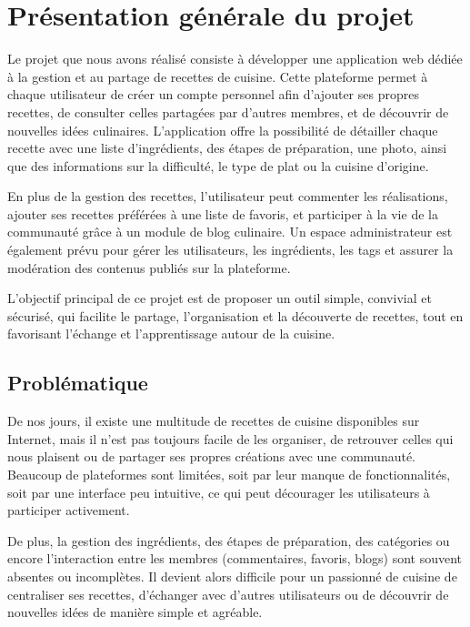 \documentclass[12pt,a4paper]{report}
\begin{document}
\section{Présentation générale du projet}

Le projet que nous avons réalisé consiste à développer une application web dédiée à la gestion et au partage de recettes de cuisine. Cette plateforme permet à chaque utilisateur de créer un compte personnel afin d’ajouter ses propres recettes, de consulter celles partagées par d’autres membres, et de découvrir de nouvelles idées culinaires. L’application offre la possibilité de détailler chaque recette avec une liste d’ingrédients, des étapes de préparation, une photo, ainsi que des informations sur la difficulté, le type de plat ou la cuisine d’origine.

En plus de la gestion des recettes, l’utilisateur peut commenter les réalisations, ajouter ses recettes préférées à une liste de favoris, et participer à la vie de la communauté grâce à un module de blog culinaire. Un espace administrateur est également prévu pour gérer les utilisateurs, les ingrédients, les tags et assurer la modération des contenus publiés sur la plateforme.

L’objectif principal de ce projet est de proposer un outil simple, convivial et sécurisé, qui facilite le partage, l’organisation et la découverte de recettes, tout en favorisant l’échange et l’apprentissage autour de la cuisine.
\newpage
\subsection{Problématique}

De nos jours, il existe une multitude de recettes de cuisine disponibles sur Internet, mais il n’est pas toujours facile de les organiser, de retrouver celles qui nous plaisent ou de partager ses propres créations avec une communauté. Beaucoup de plateformes sont limitées, soit par leur manque de fonctionnalités, soit par une interface peu intuitive, ce qui peut décourager les utilisateurs à participer activement.

De plus, la gestion des ingrédients, des étapes de préparation, des catégories ou encore l’interaction entre les membres (commentaires, favoris, blogs) sont souvent absentes ou incomplètes. Il devient alors difficile pour un passionné de cuisine de centraliser ses recettes, d’échanger avec d’autres utilisateurs ou de découvrir de nouvelles idées de manière simple et agréable.
\end{document}
